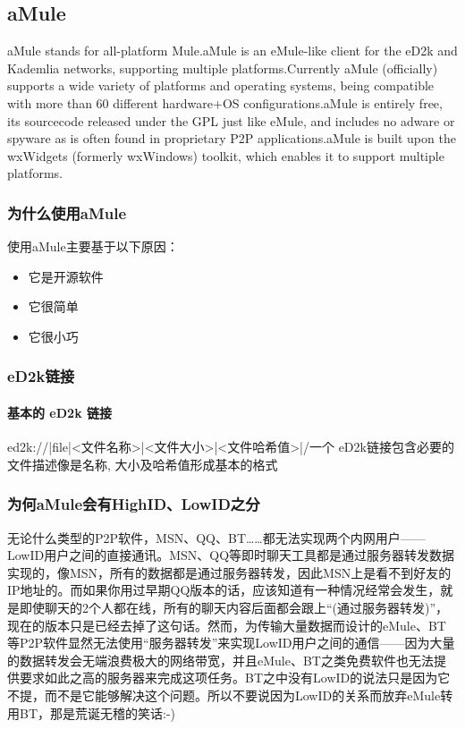 \documentclass[paper=a4,fontsize=11pt]{article}
\begin{document}
	\subsection{aMule}
	aMule stands for all-platform Mule.aMule is an eMule-like client for the eD2k and Kademlia networks, supporting multiple platforms.Currently aMule (officially) supports a wide variety of platforms and operating systems, being compatible with more than 60 different hardware+OS configurations.aMule is entirely free, its sourcecode released under the GPL just like eMule, and includes no adware or spyware as is often found in proprietary P2P applications.aMule is built upon the wxWidgets (formerly wxWindows) toolkit, which enables it to support multiple platforms.
	\subsubsection{为什么使用aMule}
	使用aMule主要基于以下原因：
	\begin{itemize}
		\item{它是开源软件}
		\item{它很简单}
		\item{它很小巧}
	\end{itemize}
	
	\subsubsection{eD2k链接}

	\paragraph{基本的 eD2k 链接}
	ed2k://|file|<文件名称>|<文件大小>|<文件哈希值>|/一个 eD2k链接包含必要的文件描述像是名称, 大小及哈希值形成基本的格式
	
	\subsubsection{为何aMule会有HighID、LowID之分}
	
	无论什么类型的P2P软件，MSN、QQ、BT……都无法实现两个内网用户——LowID用户之间的直接通讯。MSN、QQ等即时聊天工具都是通过服务器转发数据实现的，像MSN，所有的数据都是通过服务器转发，因此MSN上是看不到好友的IP地址的。而如果你用过早期QQ版本的话，应该知道有一种情况经常会发生，就是即使聊天的2个人都在线，所有的聊天内容后面都会跟上“(通过服务器转发)”，现在的版本只是已经去掉了这句话。然而，为传输大量数据而设计的eMule、BT等P2P软件显然无法使用“服务器转发”来实现LowID用户之间的通信——因为大量的数据转发会无端浪费极大的网络带宽，并且eMule、BT之类免费软件也无法提供要求如此之高的服务器来完成这项任务。BT之中没有LowID的说法只是因为它不提，而不是它能够解决这个问题。所以不要说因为LowID的关系而放弃eMule转用BT，那是荒诞无稽的笑话:-)
		
\end{document}

